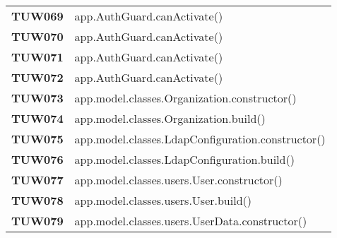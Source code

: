 \documentclass[../../piano-di-qualifica.tex]{subfiles}
\begin{document}
\begin{longtable}[H]{>{\centering\bfseries}m{3cm} >{}m{13cm}}
  TUW069             & app.AuthGuard.canActivate\@()                                                                           \\

  TUW070             & app.AuthGuard.canActivate\@()                                                                           \\

  TUW071             & app.AuthGuard.canActivate\@()                                                                           \\

  TUW072             & app.AuthGuard.canActivate\@()                                                                           \\


  TUW073             & app.model.classes.Organization.constructor\@()                                                          \\

  TUW074             & app.model.classes.Organization.build\@()                                                                \\



  TUW075             & app.model.classes.LdapConfiguration.constructor\@()                                                     \\

  TUW076             & app.model.classes.LdapConfiguration.build\@()                                                           \\


  TUW077             & app.model.classes.users.User.constructor\@()                                                            \\

  TUW078             & app.model.classes.users.User.build\@()                                                                  \\


  TUW079             & app.model.classes.users.UserData.constructor\@()                                                        \\


\end{longtable}
\end{document}
